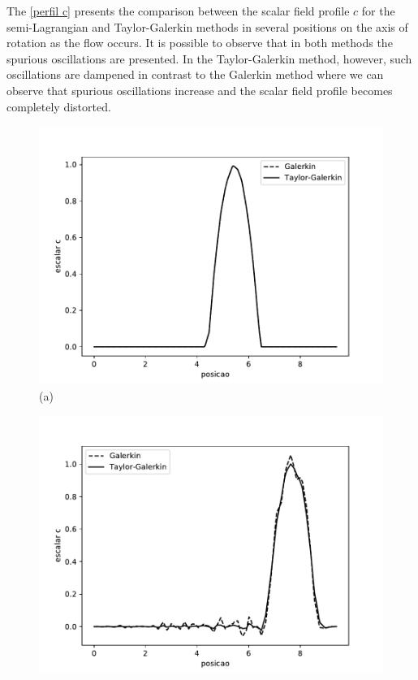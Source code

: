 \medskip
The \ref{perfil c} presents the comparison between the scalar field
profile $c$ for the semi-Lagrangian and Taylor-Galerkin methods in 
several positions on the axis of rotation as the flow occurs. 
It is possible to observe that in both methods the spurious oscillations 
are presented. In the Taylor-Galerkin method, however, 
such oscillations are dampened in contrast to the Galerkin method 
where we can observe that spurious oscillations increase and 
the scalar field profile becomes completely distorted.

\begin{center}
\begin{figure}[H]
     \centering
     \begin{minipage}{.5\linewidth}
      \centering
      \includegraphics[scale=0.53]{./02_chaps/cap_validation/figure/convection_0.pdf}\\
      (a)
     \end{minipage}%
     \begin{minipage}{.5\linewidth}
      \centering
      \includegraphics[scale=0.53]{./02_chaps/cap_validation/figure/convection_300.pdf}\\

\end{minipage}
\end{figure}
\end{center}
